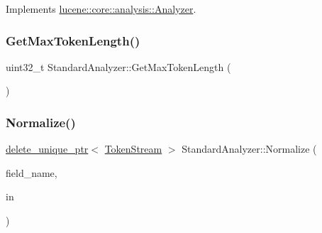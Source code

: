 Implements \mbox{\hyperlink{classlucene_1_1core_1_1analysis_1_1Analyzer_a9b7dc3c598057fbf4e9b5f48066cb54a}{lucene\+::core\+::analysis\+::\+Analyzer}}.

\mbox{\label{classlucene_1_1core_1_1analysis_1_1standard_1_1StandardAnalyzer_a383601d5fa0bcd3883f794c887512517}} 
\subsubsection{\texorpdfstring{Get\+Max\+Token\+Length()}{GetMaxTokenLength()}}
{\footnotesize\ttfamily uint32\+\_\+t Standard\+Analyzer\+::\+Get\+Max\+Token\+Length (\begin{DoxyParamCaption}{ }\end{DoxyParamCaption})}

\mbox{\label{classlucene_1_1core_1_1analysis_1_1standard_1_1StandardAnalyzer_aa42382c6504229a195abbc25f048a614}} 
\subsubsection{\texorpdfstring{Normalize()}{Normalize()}}
{\footnotesize\ttfamily \mbox{\hyperlink{namespacelucene_1_1core_1_1analysis_a1ecb3e92b19c3afd8060d81a437a7a3b}{delete\+\_\+unique\+\_\+ptr}}$<$ \mbox{\hyperlink{classlucene_1_1core_1_1analysis_1_1TokenStream}{Token\+Stream}} $>$ Standard\+Analyzer\+::\+Normalize (\begin{DoxyParamCaption}\item[{\mbox{\hyperlink{ZlibCrc32_8h_a2c212835823e3c54a8ab6d95c652660e}{const}} std\+::string \&}]{field\+\_\+name,  }\item[{\mbox{\hyperlink{namespacelucene_1_1core_1_1analysis_a1ecb3e92b19c3afd8060d81a437a7a3b}{delete\+\_\+unique\+\_\+ptr}}$<$ \mbox{\hyperlink{classlucene_1_1core_1_1analysis_1_1TokenStream}{Token\+Stream}} $>$}]{in }\end{DoxyParamCaption})\hspace{0.3cm}{\ttfamily [protected]}}

